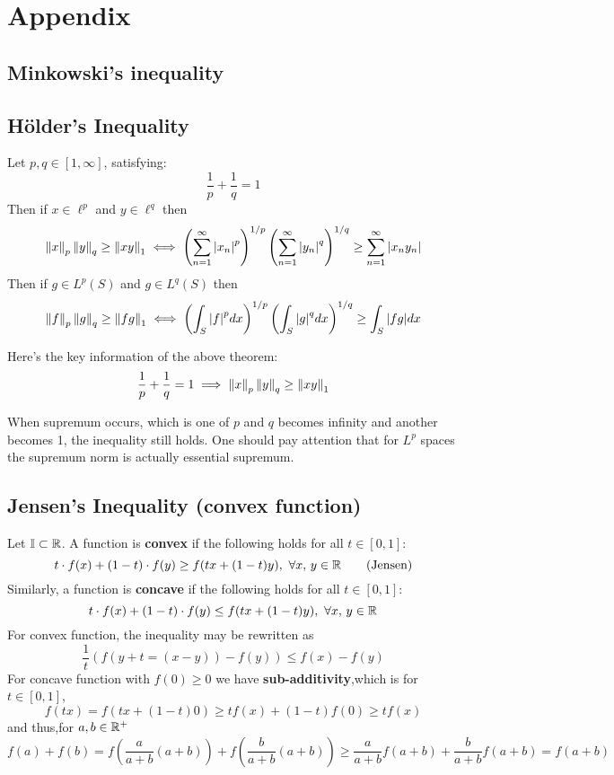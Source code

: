 \newpage
\section{Appendix}
\subsection{Minkowski's inequality}\label{Minkowski-holder}

\subsection{Hölder's Inequality}\label{Hölder's inequality}
\begin{theorem}\rm\nextline
Let $p,q\in[1,\infty]$,	satisfying:
$$
\frac{1}{p}+\frac{1}{q}=1
$$
Then if $x\in\ell^p$ and $y\in\ell^q$ then 
$$
\left\|{x}\right\|_p\left\|{y}\right\|_q\geq\left\|{xy}\right\|_1
\iff
\left(\sum_{n=1}^\infty{|x_n|}^p\right)^{1/p}
\left(\sum_{n=1}^\infty{|y_n|}^q\right)^{1/q}\geq\sum_{n=1}^\infty|x_ny_n|
$$
Then if $g\in L^p(S)$ and $g\in L^q(S)$ then 
$$
\left\|{f}\right\|_p\left\|{g}\right\|_q\geq\left\|{fg}\right\|_1
\iff
\left(\int_S{|f|}^pdx\right)^{1/p}
\left(\int_S{|g|}^qdx\right)^{1/q}
\geq\int_S|fg|dx
$$
\end{theorem}
\begin{remark}\rm\nextline
Here's the key information of the above theorem:
$$
\frac{1}{p}+\frac{1}{q}=1\implies \left\|{x}\right\|_p\left\|{y}\right\|_q\geq\left\|{xy}\right\|_1
$$
\end{remark}
\begin{remark}
When supremum occurs, which is  one of $p$ and $q$ becomes infinity and another becomes 1, the inequality still holds. One should pay attention that for $L^p$ spaces the supremum norm is actually essential supremum.
\end{remark}


\subsection{Jensen's Inequality (convex function)}\label{Jensen's inquality}
Let $\mathbb{I}\subset \mathbb{R}$. A function  is {\bf convex} if the following holds for all $t\in[0,1]$:
$$
	t\cdot f(x)+(1-t)\cdot f(y)\geq f(tx+(1-t)y),\,\,\forall x,\,y\in \mathbb{R}\quad\quad\text{(Jensen)}
$$
Similarly,  a function  is {\bf concave} if the following holds for all $t\in[0,1]$:
$$
	t\cdot f(x)+(1-t)\cdot f(y)\leq f(tx+(1-t)y),\,\,\forall x,\,y\in \mathbb{R}
$$
For convex function, the inequality may be rewritten as
$$
	\frac{1}{t}(f(y+t
	=(x-y))-f(y))\leq f(x)-f(y)
$$
For concave function with $f(0)\geq 0$ we have {\bf sub-additivity},which is for $t\in[0,1]$,
$$
	f(tx)=f(tx+(1-t)0)\geq tf(x)+(1-t)f(0)\geq tf(x)
$$
and thus,for $a,b\in\mathbb{R}^+$
$$
	f(a)+f(b)=f(\frac{a}{a+b}(a+b))+f(\frac{b}{a+b}(a+b))\geq \frac{a}{a+b}f(a+b)+\frac{b}{a+b}f(a+b)=f(a+b)
$$

